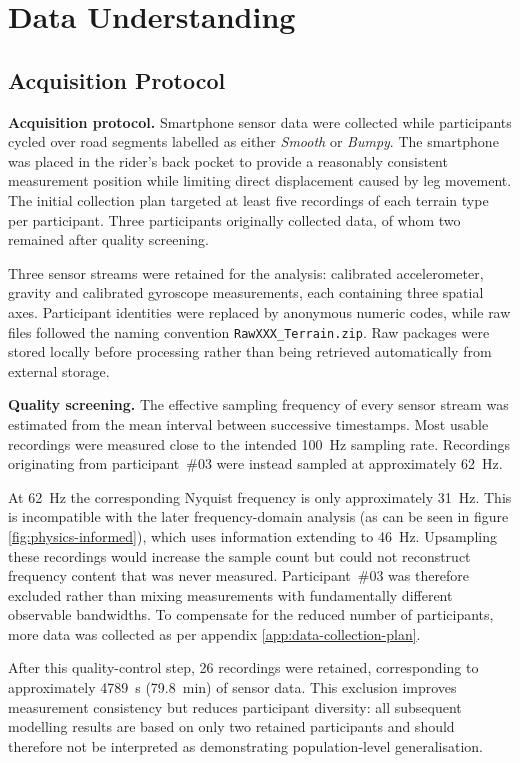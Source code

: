\section{Data Understanding}
\label{sec:data-understanding}

\subsection{Acquisition Protocol}

\textbf{Acquisition protocol.}
Smartphone sensor data were collected while participants cycled over road
segments labelled as either \textit{Smooth} or \textit{Bumpy}. The smartphone
was placed in the rider's back pocket to provide a reasonably consistent
measurement position while limiting direct displacement caused by leg
movement. The initial collection plan targeted at least five recordings of each terrain
type per participant. Three participants originally collected data,
of whom two remained after quality screening.

Three sensor streams were retained for the analysis: calibrated
accelerometer, gravity and calibrated gyroscope measurements, each containing
three spatial axes. Participant identities were replaced by anonymous numeric
codes, while raw files followed the naming convention
\texttt{RawXXX\_Terrain.zip}. Raw packages were stored locally before
processing rather than being retrieved automatically from external storage.

\textbf{Quality screening.}
The effective sampling frequency of every sensor stream was estimated from
the mean interval between successive timestamps. Most usable recordings were
measured close to the intended 100~Hz sampling rate. Recordings originating
from participant~\#03 were instead sampled at approximately 62~Hz.

At 62~Hz the corresponding Nyquist frequency is only approximately
31~Hz. This is incompatible with the later frequency-domain analysis
(as can be seen in figure \ref{fig:physics-informed}), which uses information
extending to 46~Hz. Upsampling these recordings would increase the sample count but 
could not reconstruct frequency content that was never measured. Participant~\#03 was
therefore excluded rather than mixing measurements with fundamentally
different observable bandwidths. To compensate for the reduced number of participants,
more data was collected as per appendix \ref{app:data-collection-plan}.

After this quality-control step, 26 recordings were retained, corresponding
to approximately 4789~s (79.8~min) of sensor data. This exclusion improves
measurement consistency but reduces participant diversity: all subsequent
modelling results are based on only two retained participants and should
therefore not be interpreted as demonstrating population-level
generalisation.


